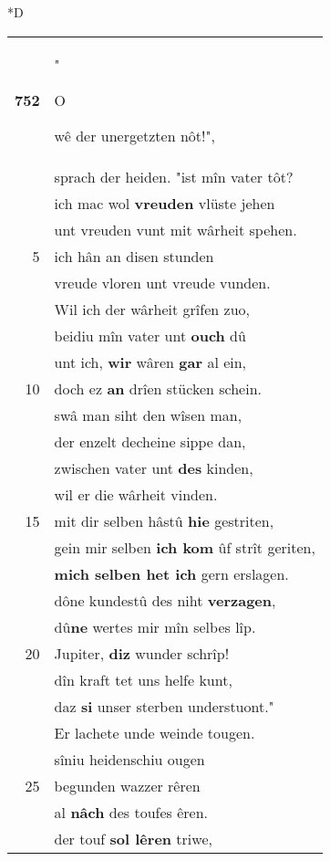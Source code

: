 \documentclass[8pt,a4paper,notitlepage]{article}
\begin{document}
\begin{table}[ht]
\begin{minipage}[t]{0.5\linewidth}
\small
\begin{center}*D
\end{center}
\begin{tabular}{rl}
\textbf{752} & "\begin{large}O\end{large}wê der unergetzten nôt!",\\ 
 & sprach der heiden. "ist mîn vater tôt?\\ 
 & ich mac wol \textbf{vreuden} vlüste jehen\\ 
 & unt vreuden vunt mit wârheit spehen.\\ 
5 & ich hân an disen stunden\\ 
 & vreude vloren unt vreude vunden.\\ 
 & Wil ich der wârheit grîfen zuo,\\ 
 & beidiu mîn vater unt \textbf{ouch} dû\\ 
 & unt ich, \textbf{wir} wâren \textbf{gar} al ein,\\ 
10 & doch ez \textbf{an} drîen stücken schein.\\ 
 & swâ man siht den wîsen man,\\ 
 & der enzelt decheine sippe dan,\\ 
 & zwischen vater unt \textbf{des} kinden,\\ 
 & wil er die wârheit vinden.\\ 
15 & mit dir selben hâstû \textbf{hie} gestriten,\\ 
 & gein mir selben \textbf{ich kom} ûf strît geriten,\\ 
 & \textbf{mich selben het ich} gern erslagen.\\ 
 & dône kundestû des niht \textbf{verzagen},\\ 
 & dû\textbf{ne} wertes mir mîn selbes lîp.\\ 
20 & Jupiter, \textbf{diz} wunder schrîp!\\ 
 & dîn kraft tet uns helfe kunt,\\ 
 & daz \textbf{si} unser sterben understuont."\\ 
 & Er lachete unde weinde tougen.\\ 
 & sîniu heidenschiu ougen\\ 
25 & begunden wazzer rêren\\ 
 & al \textbf{nâch} des toufes êren.\\ 
 & der touf \textbf{sol lêren} triwe,\\ 

\end{tabular}
\end{minipage}
\end{table}
\end{document}
